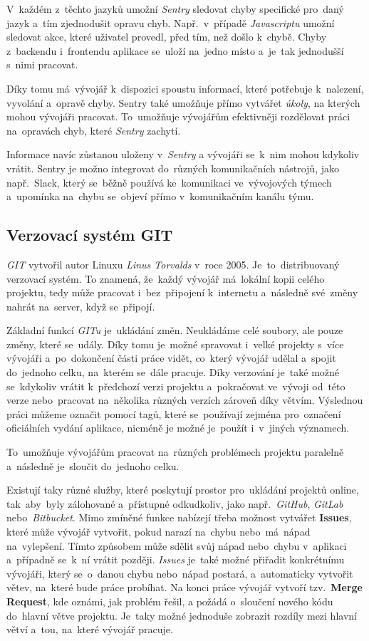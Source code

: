 \documentclass[10pt,a4paper]{article}
\begin{document}
                V~každém z~těchto jazyků umožní \emph{Sentry} sledovat chyby specifické pro~daný jazyk a~tím zjednodušit opravu chyb. Např.~v~případě \emph{Javascriptu} umožní sledovat akce, které uživatel provedl, před tím, než došlo k~chybě. Chyby z~backendu i~frontendu aplikace se~uloží na~jedno místo a~je~tak jednodušší s~nimi pracovat.

                Díky tomu má~vývojář k~dispozici spoustu informací, které potřebuje k~nalezení, vyvolání a~opravě chyby. Sentry také umožňuje přímo vytvářet \emph{úkoly}, na kterých mohou vývojáři pracovat. To~umožňuje vývojářům efektivněji rozdělovat práci na~opravách chyb, které \emph{Sentry} zachytí.

                Informace navíc zůstanou uloženy v~\emph{Sentry} a vývojáři se~k~nim mohou kdykoliv vrátit. Sentry je možno integrovat do~různých komunikačních nástrojů, jako např.~Slack, který se~běžně používá ke~komunikaci ve~vývojových týmech a~upomínka na~chybu se~objeví přímo v~komunikačním kanálu týmu.
	
        \subsection{Verzovací systém GIT}
            \emph{GIT} vytvořil autor Linuxu \emph{Linus Torvalds} v~roce 2005. Je~to~distribuovaný verzovací systém. To znamená, že~každý vývojář má~lokální kopii celého projektu, tedy může pracovat i~bez~připojení k~internetu a~následně své~změny nahrát na~server, když se~připojí.
            
            Základní funkcí \emph{GITu} je~ukládání změn. Neukládáme celé soubory, ale pouze změny, které se~udály. Díky tomu je~možné spravovat i~velké projekty s~více vývojáři a~po~dokončení části práce vidět, co~který vývojář udělal a~spojit do~jednoho celku, na~kterém se~dále pracuje. Díky verzování je~také možné se~kdykoliv vrátit k~předchozí verzi projektu a~pokračovat ve~vývoji od~této verze nebo~pracovat na~několika různých verzích zároveň díky větvím. Výslednou práci můžeme označit pomocí tagů, které se~používají zejména pro~označení oficiálních vydání aplikace, nicméně je možné je~použít i~v~jiných významech.
            
            To~umožňuje vývojářům pracovat na~různých problémech projektu paralelně a~následně je~sloučit do~jednoho celku.

            Existují taky různé služby, které poskytují prostor pro~ukládání projektů online, tak~aby~byly zálohované a~přístupné odkudkoliv, jako např.~\emph{GitHub}, \emph{GitLab} nebo~\emph{Bitbucket}. Mimo zmíněné funkce nabízejí třeba možnost vytvářet \textbf{Issues}, které může vývojář vytvořit, pokud narazí na~chybu nebo~má~nápad na~vylepšení. Tímto způsobem může sdělit svůj nápad nebo~chybu v~aplikaci a~případně se~k~ní vrátit později. \emph{Issues} je~také možné přiřadit konkrétnímu vývojáři, který se~o~danou chybu nebo~nápad postará, a~automaticky vytvořit větev, na~které bude práce probíhat. Na konci práce vývojář vytvoří tzv.~\textbf{Merge Request}, kde oznámi, jak problém řešil, a požádá o~sloučení nového kódu do~hlavní větve projektu. Je~taky možné jednoduše zobrazit rozdíly mezi hlavní větví a~tou, na~které vývojář pracuje.
            
\end{document}
